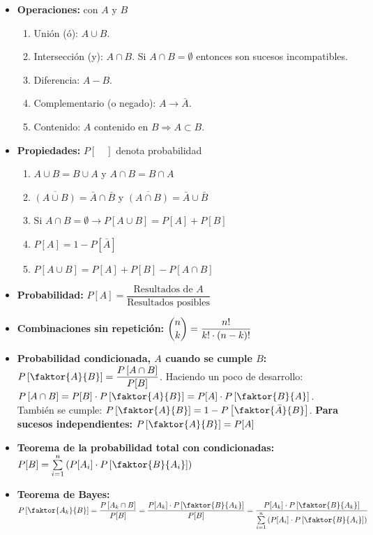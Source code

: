\documentclass[a4paper, twocolumn, 10pt]{article}
\begin{document}
\begin{itemize}
	\item \textbf{Operaciones:} con $A$ y $B$
	\begin{enumerate}
		\item Unión (ó): $A\cup B.$
		\item Intersección (y): $A\cap B$. Si $A \cap B = \emptyset$ entonces son sucesos incompatibles.
		\item Diferencia: $A-B.$
		\item Complementario (o negado): $A \rightarrow \bar{A}.$
		\item Contenido: $A$ contenido en $B \Rightarrow A\subset B.$
	\end{enumerate}
 	\item \textbf{Propiedades:} $P[\quad]$ denota probabilidad
 	\begin{enumerate}
 		\item $A \cup B = B \cup A$ y $A \cap B = B\cap A$
 		\item $\overline{(A \cup B)} = \bar{A} \cap \bar{B}$ y $\overline{(A \cap B)} = \bar{A} \cup \bar{B}$
 		\item Si $A \cap B = \emptyset \rightarrow P[A \cup B] = P[A] + P[B]$
 		\item $P[A] = 1 - P[\bar{A}]$
 		\item $P[A\cup B] = P[A] + P[B] - P[A \cap B]$
 	\end{enumerate}
 	\item \textbf{Probabilidad:} $P[A] = \dfrac{\text{Resultados de } A}{\text{Resultados posibles}}$
 	\item \textbf{Combinaciones sin repetición:} $\dbinom{n}{k} = \dfrac{n!}{k!\cdot(n-k)!}$
 	\item \textbf{Probabilidad condicionada, $A$ cuando se cumple $B$:} $P\left[\faktor{A}{B}\right] = \dfrac{P\left[A\cap B\right]}{P[B]}$. Haciendo un poco de desarrollo: $P\left[A\cap B\right] = P[B] \cdot P\left[\faktor{A}{B}\right] = P[A]\cdot P\left[\faktor{B}{A}\right]$. También se cumple: $P\left[\faktor{A}{B}\right] = 1 - P\left[\faktor{\bar{A}}{B}\right]$. \textbf{Para sucesos independientes:} $P\left[\faktor{A}{B}\right] = P[A]$
 	\item \textbf{Teorema de la probabilidad total con condicionadas:} $P[B] = \sum\limits_{i=1}^{n}\left(P[A_i] \cdot P\left[\faktor{B}{A_i}\right]\right)$
 	\item \textbf{Teorema de Bayes:} $P\left[\faktor{A_k}{B}\right] = \dfrac{P\left[A_k\cap B\right]}{P[B]} = \dfrac{P[A_k]\cdot P\left[\faktor{B}{A_k}\right]}{P[B]} = \dfrac{P[A_k]\cdot P\left[\faktor{B}{A_k}\right]}{\sum\limits_{i=1}^{n}\left(P[A_i] \cdot P\left[\faktor{B}{A_i}\right]\right)}$ 
\end{itemize}
\end{document}
